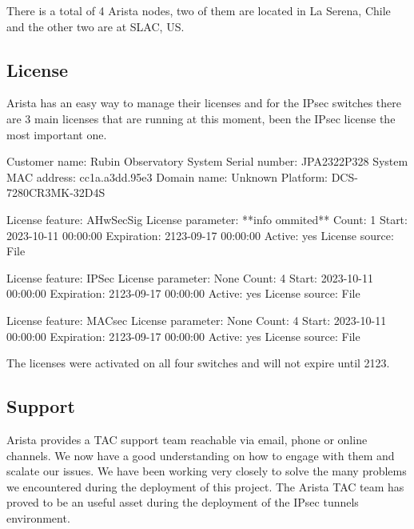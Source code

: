 There is a total of 4 Arista nodes, two of them are located in La Serena, Chile and the other two are at SLAC, US. 

\subsection{License}

Arista has an easy way to manage their licenses and for the IPsec switches there are 3 main licenses that are running at this moment, been the IPsec license the most important one.

Customer name:         Rubin Observatory
System Serial number:  JPA2322P328
System MAC address:    cc1a.a3dd.95e3
Domain name:           Unknown
Platform:              DCS-7280CR3MK-32D4S

License feature:  AHwSecSig 
        License parameter:  **info ommited** 
        Count:              1
        Start:              2023-10-11 00:00:00
        Expiration:         2123-09-17 00:00:00
        Active:             yes
        License source:     File


License feature:  IPSec 
        License parameter:  None
        Count:              4
        Start:              2023-10-11 00:00:00
        Expiration:         2123-09-17 00:00:00
        Active:             yes
        License source:     File


License feature:  MACsec 
        License parameter:  None
        Count:              4
        Start:              2023-10-11 00:00:00
        Expiration:         2123-09-17 00:00:00
        Active:             yes
        License source:     File


The licenses were activated on all four switches and will not expire until 2123.


\subsection{Support}

Arista provides a TAC support team reachable via email, phone or online channels. We now have a good understanding on how to engage with them and scalate our issues. We have been working very closely to solve the many problems we encountered during the deployment of this project.
The Arista TAC team has proved to be an useful asset during the deployment of the IPsec tunnels environment.  



